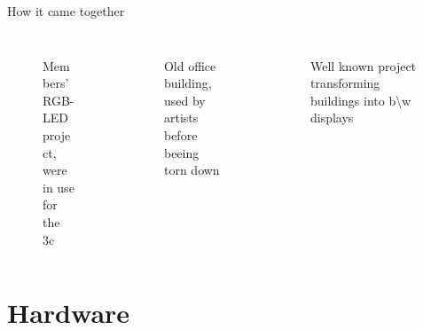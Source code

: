 \documentclass{beamer}
\begin{document}
\begin{frame}{How it came together}
\begin{columns}
\begin{column}{3.5cm}
\begin{figure}
\begin{center}
          \end{center}
        \end{figure}
\end{column}
\end{columns}
\begin{columns}[T]
\begin{column}{3.5cm}
        \begin{figure}
          \begin{center}
          Members' RGB-LED project, \\were in use for the 3c
          \end{center}
        \end{figure}

\end{column}
\begin{column}{3.5cm}
        \begin{figure}
          \begin{center}
          Old office building,\\used by artists before beeing torn down
          \end{center}
        \end{figure}

\end{column}
\begin{column}{3.5cm}
        \begin{figure}
          \begin{center}
          Well known project transforming buildings into b\textbackslash w displays
          \end{center}
        \end{figure}

    \end{column}
\end{columns}
\end{frame}
\section{Hardware}
\end{document}
